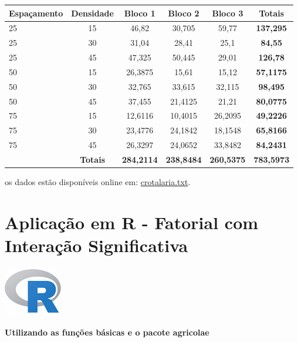 \documentclass[
]{book}
\begin{document}
\begin{longtable}[]{@{}lccccc@{}}
\toprule
Espaçamento & Densidade & Bloco 1 & Bloco 2 & Bloco 3 & Totais\tabularnewline
\midrule
\endhead
25 & 15 & 46,82 & 30,705 & 59,77 & \textbf{137,295}\tabularnewline
25 & 30 & 31,04 & 28,41 & 25,1 & \textbf{84,55}\tabularnewline
25 & 45 & 47,325 & 50,445 & 29,01 & \textbf{126,78}\tabularnewline
50 & 15 & 26,3875 & 15,61 & 15,12 & \textbf{57,1175}\tabularnewline
50 & 30 & 32,765 & 33,615 & 32,115 & \textbf{98,495}\tabularnewline
50 & 45 & 37,455 & 21,4125 & 21,21 & \textbf{80,0775}\tabularnewline
75 & 15 & 12,6116 & 10,4015 & 26,2095 & \textbf{49,2226}\tabularnewline
75 & 30 & 23,4776 & 24,1842 & 18,1548 & \textbf{65,8166}\tabularnewline
75 & 45 & 26,3297 & 24,0652 & 33,8482 & \textbf{84,2431}\tabularnewline
& \textbf{Totais} & \textbf{284,2114} & \textbf{238,8484} & \textbf{260,5375} & \textbf{783,5973}\tabularnewline
\bottomrule
\end{longtable}

os dados estão disponíveis online em: \href{https://raw.githubusercontent.com/arpanosso/ExpAgr_2020/master/dados/crotalaria.txt}{crotalaria.txt}.

\hypertarget{aplicauxe7uxe3o-em-r---fatorial-com-interauxe7uxe3o-significativa}{%
\section{Aplicação em R - Fatorial com Interação Significativa}\label{aplicauxe7uxe3o-em-r---fatorial-com-interauxe7uxe3o-significativa}}

\includegraphics{R.png}

\textbf{Utilizando as funções básicas e o pacote agricolae}
\end{document}
